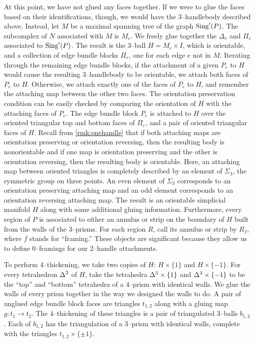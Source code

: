 At this point, we have not glued any faces together.
If we were to glue the faces based on their identifications, though, we would have the 3--handlebody described above.
Instead, let $M$ be a maximal spanning tree of the graph $\textrm{Sing}'(P)$.
The subcomplex of $N$ associated with $M$ is $M_c$.
We freely glue together the $\Delta_v$ and $\Pi_e$ associated to $\textrm{Sing}'(P)$.
The result is the 3--ball $H=M_c\times I$, which is orientable, and a collection of edge bundle blocks $\Pi_e$, one for each edge $e$ not in $M$.
Iterating through the remaining edge bundle blocks, if the attachment of a given $P_e$ to $H$ would cause the resulting 3--handlebody to be orientable, we attach both faces of $P_e$ to $H$.
Otherwise, we attach exactly one of the faces of $P_e$ to $H$, and remember the attaching map between the other two faces.
The orientation preservation condition can be easily checked by comparing the orientation of $H$ with the attaching faces of $P_e$.
The edge bundle block $P_e$ is attached to $H$ over the oriented triangular top and bottom faces of $\Pi_e$, and a pair of oriented triangular faces of $H$.
Recall from \ref{rmk:onehandle} that if both attaching maps are orientation preserving or orientation reversing, then the resulting body is nonorientable and if one map is orientation preserving and the other is orientation reversing, then the resulting body is orientable.
Here, an attaching map between oriented triangles is completely described by an element of $\Sigma_3$, the symmetric group on three points.
An even element of $\Sigma_3$ corresponds to an orientation preserving attaching map and an odd element corresponds to an orientation reversing attaching map.
The result is an orientable simplicial manifold $H$ along with some additional gluing information.
Furthermore, every region of $P$ is associated to either an annulus or strip on the boundary of $H$ built from the walls of the 3--prisms.
For each region $R$, call its annulus or strip by $R_f$, where $f$ stands for ``framing.''
These objects are significant because they allow us to define 0--framings for our 2--handle attachments.

To perform 4--thickening, we take two copies of $H$: $H\times\{1\}$ and $H\times \{-1\}$.
For every tetrahedron $\Delta^3$ of $H$, take the tetrahedra $\Delta^3\times\{1\}$ and $\Delta^3\times\{-1\}$ to be the ``top'' and ``bottom'' tetrahedra of a 4--prism with identical walls.
We glue the walls of every prism together in the way we designed the walls to do.
A pair of unglued edge bundle block faces are triangles $t_{1,2}$ along with a gluing map $g:t_1\to t_2$.
The 4--thickening of these triangles is a pair of triangulated 3--balls $b_{1,2}$.
Each of $b_{1,2}$ has the triangulation of a 3--prism with identical walls, complete with the triangles $t_{1,2}\times\{\pm 1\}$.

